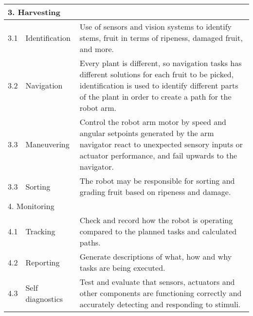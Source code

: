 \documentclass[%
oneside,    %
project,    %
nosummary   %
]{USN-MSc}
\begin{document}
\begin{longtable}{| m{1.5cm} | m{3cm} | m{10cm} |}
  \multicolumn{3}{|l|}{3. Harvesting}                                                                                                                                                                                                         \\ \hline
  3.1
   & Identification
   & Use of sensors and vision systems to identify stems, fruit in terms of ripeness, damaged fruit, and more.                                                                                                                                \\ \hline
  3.2
   & Navigation
   & Every plant is different, so navigation tasks has different solutions for each fruit to be picked, identification is used to identify different parts of the plant in order to create a path for the robot arm.                          \\ \hline
  3.3
   & Maneuvering
   & Control the robot arm motor by speed and angular setpoints generated by the arm navigator react to unexpected sensory inputs or actuator performance, and fail upwards to the navigator.                                                 \\ \hline
  3.3
   & Sorting
   & The robot may be responsible for sorting and grading fruit based on ripeness and damage.                                                                                                                                                 \\ \hline
  \multicolumn{3}{|l|}{4. Monitoring}                                                                                                                                                                                                         \\ \hline
  4.1
   & Tracking
   & Check and record how the robot is operating compared to the planned tasks and calculated paths.                                                                                                                                          \\ \hline
  4.2
   & Reporting
   & Generate descriptions of what, how and why tasks are being executed.                                                                                                                                                                     \\ \hline
  4.3
   & Self diagnostics
   & Test and evaluate that sensors, actuators and other components are functioning correctly and accurately detecting and responding to stimuli.                                                                                             \\ \hline

\end{longtable}
\end{document}

